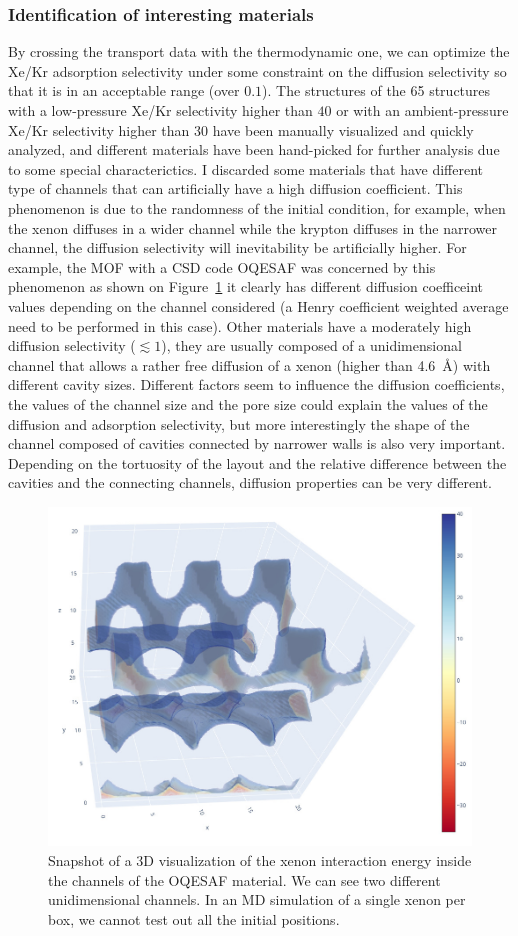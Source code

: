 \documentclass[main]{subfiles}
\begin{document}
\subsubsection{Identification of interesting materials}

By crossing the transport data with the thermodynamic one, we can optimize the Xe/Kr adsorption selectivity under some constraint on the diffusion selectivity so that it is in an acceptable range (over $0.1$). The structures of the 65 structures with a low-pressure Xe/Kr selectivity higher than $40$ or with an ambient-pressure Xe/Kr selectivity higher than $30$ have been manually visualized and quickly analyzed, and different materials have been hand-picked for further analysis due to some special characterictics. I discarded some materials that have different type of channels that can artificially have a high diffusion coefficient. This phenomenon is due to the randomness of the initial condition, for example, when the xenon diffuses in a wider channel while the krypton diffuses in the narrower channel, the diffusion selectivity will inevitability be artificially higher. For example, the MOF with a CSD code OQESAF\autocite{Xie_2011} was concerned by this phenomenon as shown on Figure~\ref{fgr:OQESAF} it clearly has different diffusion coefficeint values depending on the channel considered (a Henry coefficient weighted average need to be performed in this case). Other materials have a moderately high diffusion selectivity ($\lesssim 1$), they are usually composed of a unidimensional channel that allows a rather free diffusion of a xenon (higher than \SI{4.6}{\angstrom}) with different cavity sizes. Different factors seem to influence the diffusion coefficients, the values of the channel size and the pore size could explain the values of the diffusion and adsorption selectivity, but more interestingly the shape of the channel composed of cavities connected by narrower walls is also very important. Depending on the tortuosity of the layout and the relative difference between the cavities and the connecting channels, diffusion properties can be very different. 

\begin{figure}[ht]
  \centering
    \includegraphics[height=0.4\textwidth]{figures/5-diffusion/viz/OQESAF.jpg}
    \caption{Snapshot of a 3D visualization of the xenon interaction energy inside the channels of the OQESAF\autocite{Xie_2011} material. We can see two different unidimensional channels. In an MD simulation of a single xenon per box, we cannot test out all the initial positions. }\label{fgr:OQESAF}
\end{figure}
\end{document}

